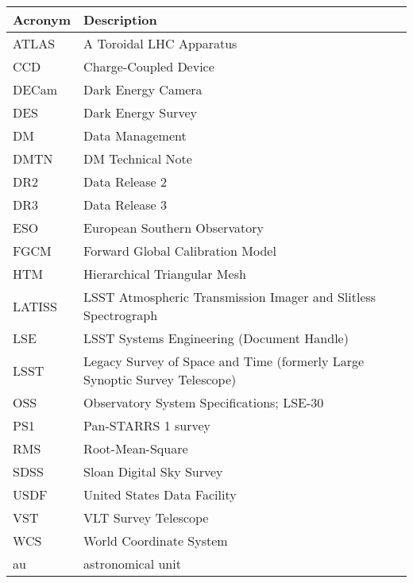 \addtocounter{table}{-1}
\begin{longtable}{p{}p{}}\hline
\textbf{Acronym} & \textbf{Description}  \\\hline

ATLAS & A Toroidal LHC Apparatus \\\hline
CCD & Charge-Coupled Device \\\hline
DECam & Dark Energy Camera \\\hline
DES & Dark Energy Survey \\\hline
DM & Data Management \\\hline
DMTN & DM Technical Note \\\hline
DR2 & Data Release 2 \\\hline
DR3 & Data Release 3 \\\hline
ESO & European Southern Observatory \\\hline
FGCM & Forward Global Calibration Model \\\hline
HTM & Hierarchical Triangular Mesh \\\hline
LATISS & LSST Atmospheric Transmission Imager and Slitless Spectrograph \\\hline
LSE & LSST Systems Engineering (Document Handle) \\\hline
LSST & Legacy Survey of Space and Time (formerly Large Synoptic Survey Telescope) \\\hline
OSS & Observatory System Specifications; LSE-30 \\\hline
PS1 & Pan-STARRS 1 survey \\\hline
RMS & Root-Mean-Square \\\hline
SDSS & Sloan Digital Sky Survey \\\hline
USDF & United States Data Facility \\\hline
VST & VLT Survey Telescope \\\hline
WCS & World Coordinate System \\\hline
au & astronomical unit \\\hline
\end{longtable}
